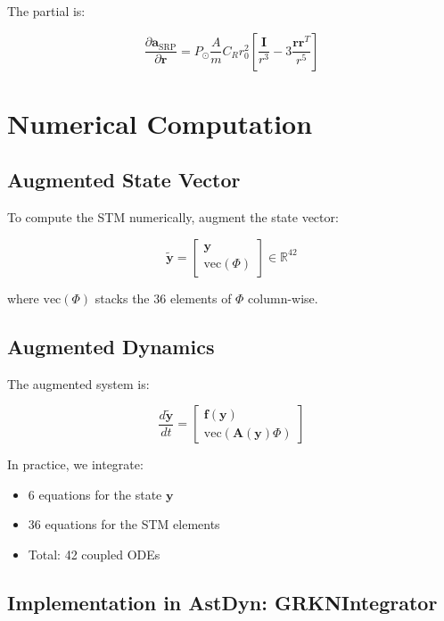 The partial is:

\begin{equation}
    \frac{\partial\mathbf{a}_{\text{SRP}}}{\partial\mathbf{r}} = P_\odot \frac{A}{m} C_R r_0^2 \left[\frac{\mathbf{I}}{r^3} - 3\frac{\mathbf{r}\mathbf{r}^T}{r^5}\right]
\end{equation}

\section{Numerical Computation}

\subsection{Augmented State Vector}

To compute the STM numerically, augment the state vector:

\begin{equation}
    \tilde{\mathbf{y}} = \begin{bmatrix} \mathbf{y} \\ \text{vec}(\Phi) \end{bmatrix} \in \mathbb{R}^{42}
\end{equation}

where $\text{vec}(\Phi)$ stacks the 36 elements of $\Phi$ column-wise.

\subsection{Augmented Dynamics}

The augmented system is:

\begin{equation}
    \frac{d\tilde{\mathbf{y}}}{dt} = \begin{bmatrix} \mathbf{f}(\mathbf{y}) \\ \text{vec}(\mathbf{A}(\mathbf{y})\Phi) \end{bmatrix}
\end{equation}

In practice, we integrate:
\begin{itemize}
    \item 6 equations for the state $\mathbf{y}$
    \item 36 equations for the STM elements
    \item Total: 42 coupled ODEs
\end{itemize}

\subsection{Implementation in AstDyn: GRKNIntegrator}

